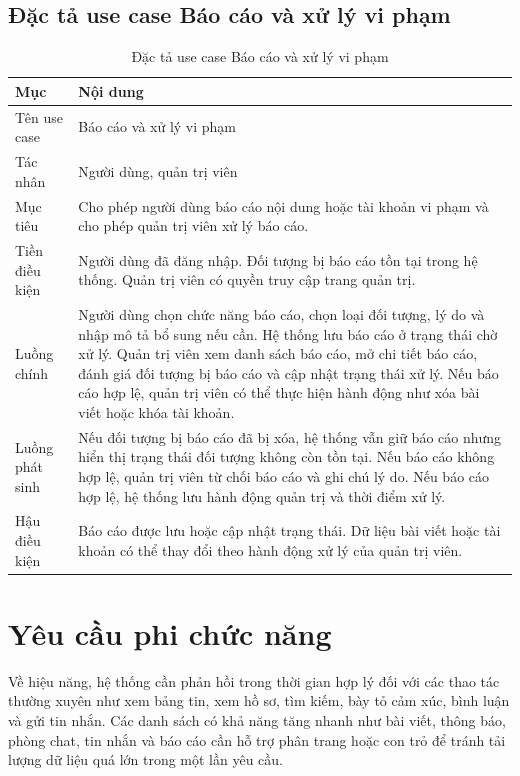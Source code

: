 \documentclass[../DoAn.tex]{subfiles}
\begin{document}
\subsection{Đặc tả use case Báo cáo và xử lý vi phạm}
\label{subsection:2.3.7}
\begin{table}[H]
\centering
\caption{Đặc tả use case Báo cáo và xử lý vi phạm}
\label{table:uc-report-admin}
\begin{tabular}{|p{3.5cm}|p{9.5cm}|}
\hline
\textbf{Mục} & \textbf{Nội dung} \\
\hline
Tên use case & Báo cáo và xử lý vi phạm \\
\hline
Tác nhân & Người dùng, quản trị viên \\
\hline
Mục tiêu & Cho phép người dùng báo cáo nội dung hoặc tài khoản vi phạm và cho phép quản trị viên xử lý báo cáo. \\
\hline
Tiền điều kiện & Người dùng đã đăng nhập. Đối tượng bị báo cáo tồn tại trong hệ thống. Quản trị viên có quyền truy cập trang quản trị. \\
\hline
Luồng chính & Người dùng chọn chức năng báo cáo, chọn loại đối tượng, lý do và nhập mô tả bổ sung nếu cần. Hệ thống lưu báo cáo ở trạng thái chờ xử lý. Quản trị viên xem danh sách báo cáo, mở chi tiết báo cáo, đánh giá đối tượng bị báo cáo và cập nhật trạng thái xử lý. Nếu báo cáo hợp lệ, quản trị viên có thể thực hiện hành động như xóa bài viết hoặc khóa tài khoản. \\
\hline
Luồng phát sinh & Nếu đối tượng bị báo cáo đã bị xóa, hệ thống vẫn giữ báo cáo nhưng hiển thị trạng thái đối tượng không còn tồn tại. Nếu báo cáo không hợp lệ, quản trị viên từ chối báo cáo và ghi chú lý do. Nếu báo cáo hợp lệ, hệ thống lưu hành động quản trị và thời điểm xử lý. \\
\hline
Hậu điều kiện & Báo cáo được lưu hoặc cập nhật trạng thái. Dữ liệu bài viết hoặc tài khoản có thể thay đổi theo hành động xử lý của quản trị viên. \\
\hline
\end{tabular}
\end{table}

\section{Yêu cầu phi chức năng}
\label{section:2.4}
Về hiệu năng, hệ thống cần phản hồi trong thời gian hợp lý đối với các thao tác thường xuyên như xem bảng tin, xem hồ sơ, tìm kiếm, bày tỏ cảm xúc, bình luận và gửi tin nhắn. Các danh sách có khả năng tăng nhanh như bài viết, thông báo, phòng chat, tin nhắn và báo cáo cần hỗ trợ phân trang hoặc con trỏ để tránh tải lượng dữ liệu quá lớn trong một lần yêu cầu.
\end{document}
